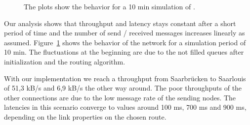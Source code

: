 {\begin{figure}[h]
   \caption[Analysis of milestone 2]{ The plots show the behavior for a 10 min simulation of .}
   
   \label{fig:analysis}
  \end{figure}

}{%

  Our analysis shows that throughput and latency stays constant after a short period of time and the number of send / received messages increases linearly as assumed. Figure~\ref{fig:analysis} shows the behavior of the  network for a simulation period of 10 min. The fluctuations at the beginning are due to the not filled queues after initialization and the routing algorithm.

  With our implementation we reach a throughput from Saarbrücken to Saarlouis of 51,3 kB/s and 6,9 kB/s the other way around. The poor throughputs of the other connections are due to the low message rate of the sending nodes. The latencies in this scenario converge to values around 100 ms, 700 ms and 900 ms, depending on the link properties on the chosen route.
  
  \begin{figure}[h]
   \centering


\end{figure}}
